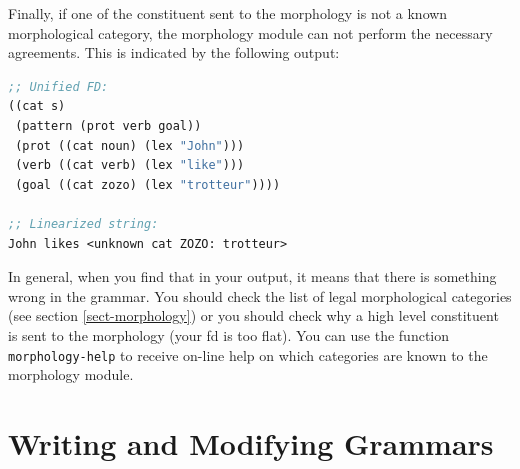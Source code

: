 \documentclass[10pt,a4paper]{report}
\begin{document}
Finally, if one of the constituent sent to the morphology is not a known
morphological category, the morphology module can not perform the necessary
agreements.  This is indicated by the following output:
 

\begin{lstlisting}[language=Lisp]
;; Unified FD:
((cat s)
 (pattern (prot verb goal))
 (prot ((cat noun) (lex "John")))
 (verb ((cat verb) (lex "like")))
 (goal ((cat zozo) (lex "trotteur"))))

;; Linearized string:
John likes <unknown cat ZOZO: trotteur> 
\end{lstlisting}

In general, when you find that in your output, it means that there is
something wrong in the grammar.  You should check the list of legal
morphological categories (see section \ref{sect-morphology}) or you should
check why a high level constituent is sent to the morphology (your fd is
too flat).  You can use the function {\tt morphology-help} to receive on-line
help on which categories are known to the morphology module.



\chapter{Writing and Modifying Grammars}
\end{document}
